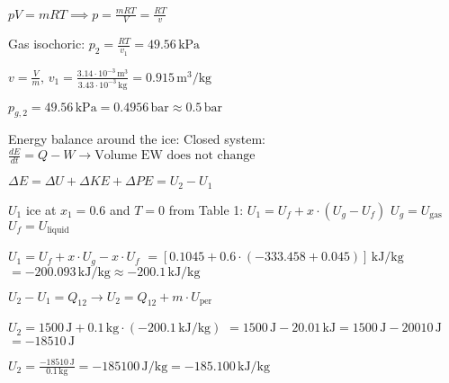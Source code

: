 \( pV = mRT \implies p = \frac{mRT}{V} = \frac{RT}{v} \)  

Gas isochoric:  
\( p_2 = \frac{RT}{v_1} = 49.56 \, \text{kPa} \)  

\( v = \frac{V}{m}, \, v_1 = \frac{3.14 \cdot 10^{-3} \, \text{m}^3}{3.43 \cdot 10^{-3} \, \text{kg}} = 0.915 \, \text{m}^3/\text{kg} \)

\( p_{g,2} = 49.56 \, \text{kPa} = 0.4956 \, \text{bar} \approx 0.5 \, \text{bar} \)  

Energy balance around the ice:  
Closed system:  
\( \frac{dE}{dt} = Q - W \rightarrow \text{Volume EW does not change} \)  

\( \Delta E = \Delta U + \Delta KE + \Delta PE = U_2 - U_1 \)  

\( U_1 \) ice at \( x_1 = 0.6 \) and \( T = 0 \) from Table 1:  
\( U_1 = U_f + x \cdot (U_g - U_f) \)  
\( U_g = U_{\text{gas}} \)  
\( U_f = U_{\text{liquid}} \)  

\( U_1 = U_f + x \cdot U_g - x \cdot U_f \)  
\( = [0.1045 + 0.6 \cdot (-333.458 + 0.045)] \, \text{kJ/kg} \)  
\( = -200.093 \, \text{kJ/kg} \approx -200.1 \, \text{kJ/kg} \)  

\( U_2 - U_1 = Q_{12} \rightarrow U_2 = Q_{12} + m \cdot U_{\text{per}} \)  

\( U_2 = 1500 \, \text{J} + 0.1 \, \text{kg} \cdot (-200.1 \, \text{kJ/kg}) \)  
\( = 1500 \, \text{J} - 20.01 \, \text{kJ} = 1500 \, \text{J} - 20010 \, \text{J} \)  
\( = -18510 \, \text{J} \)  

\( U_2 = \frac{-18510 \, \text{J}}{0.1 \, \text{kg}} = -185100 \, \text{J/kg} = -185.100 \, \text{kJ/kg} \)